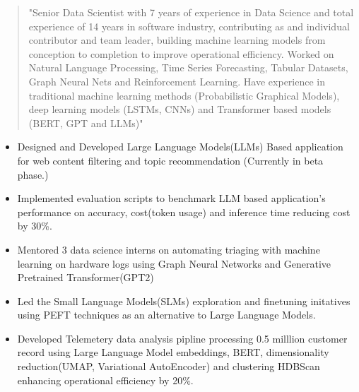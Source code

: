 \documentclass[10pt,a4paper,ragged2e,withhyper]{altacv}
\author{Gaurav Sood}
\date{\today}
\title{}
\begin{document}

\makecvheader

\begin{paracol}{1}
 \begin{quote}
"Senior Data Scientist with 7 years of experience in Data Science and total experience of 14 years in software industry, contributing as and individual contributor and team leader, building machine learning models from conception to completion to improve operational efficiency. Worked on  Natural Language Processing, Time Series Forecasting, Tabular Datasets, Graph Neural Nets and  Reinforcement Learning.  Have experience in traditional machine learning methods (Probabilistic Graphical Models), deep learning models (LSTMs, CNNs) and Transformer based models (BERT, GPT and LLMs)"
 \end{quote}
\label{sec:org56280a8}


\divider

\divider


\label{sec:org7eaf0ca}

\begin{itemize}
\item Designed and Developed Large Language Models(LLMs) Based application for web content
filtering and topic recommendation (Currently in beta phase.)
\item Implemented evaluation scripts to benchmark LLM based application's performance on
accuracy, cost(token usage) and inference time reducing cost by 30\%.
\item Mentored 3 data science interns on automating triaging with machine learning
on hardware logs using Graph Neural Networks and Generative Pretrained Transformer(GPT2)
\item Led the Small Language Models(SLMs) exploration and finetuning initatives
using PEFT techniques as an alternative to Large Language Models.
\item Developed Telemetery data analysis pipline processing 0.5 milllion customer record using Large Language Model
embeddings, BERT, dimensionality reduction(UMAP, Variational AutoEncoder) and
clustering HDBScan enhancing operational efficiency by 20\%.
\end{itemize}


\end{paracol}
\end{document}

